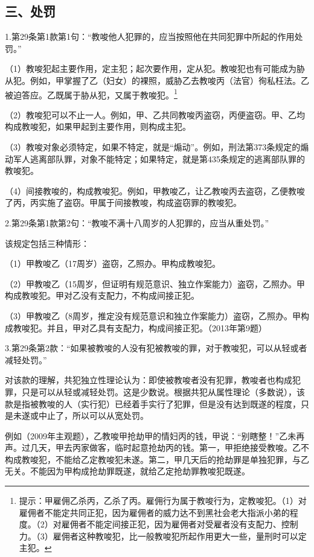 \subsection*{三、处罚}

1.第29条第1款第1句：“教唆他人犯罪的，应当按照他在共同犯罪中所起的作用处罚。”

（1）教唆犯起主要作用，定主犯；起次要作用，定从犯。教唆犯也有可能成为胁从犯。例如，甲掌握了乙（妇女）的裸照，威胁乙去教唆丙（法官）徇私枉法。乙被迫答应。乙既属于胁从犯，又属于教唆犯。\footnote{提示：甲雇佣乙杀丙，乙杀了丙。雇佣行为属于教唆行为，定教唆犯。（1）对雇佣者不能定共同正犯，因为雇佣者的威力达不到黑社会老大指派小弟的程度。（2）对雇佣者不能定间接正犯，因为雇佣者对受雇者没有支配力、控制力。（3）雇佣者这种教唆犯，比一般教唆犯所起作用更大一些，量刑时可以定主犯。}

（2）教唆犯可以不止一人。例如，甲、乙共同教唆丙盗窃，丙便盗窃。甲、乙均构成教唆犯，如果甲起到主要作用，则构成主犯。

（3）教唆对象必须特定，如果不特定，就是“煽动”。例如，刑法第373条规定的煽动军人逃离部队罪，对象不能特定；如果特定，就是第435条规定的逃离部队罪的教唆犯。

（4）间接教唆的，构成教唆犯。例如，甲教唆乙，让乙教唆丙去盗窃，乙便教唆了丙，丙实施了盗窃。甲属于间接教唆，构成盗窃罪的教唆犯。

2.第29条第1款第2句：“教唆不满十八周岁的人犯罪的，应当从重处罚。”

该规定包括三种情形：

（1）甲教唆乙（17周岁）盗窃，乙照办。甲构成教唆犯。

（2）甲教唆乙（15周岁，但证明有规范意识、独立作案能力）盗窃，乙照办。甲构成教唆犯。甲对乙没有支配力，不构成间接正犯。

（3）甲教唆乙（8周岁，推定没有规范意识和独立作案能力）盗窃，乙照办。甲构成教唆犯。并且，甲对乙具有支配力，构成间接正犯。（2013年第9题）

3.第29条第2款：“如果被教唆的人没有犯被教唆的罪，对于教唆犯，可以从轻或者减轻处罚。”

对该款的理解，共犯独立性理论认为：即使被教唆者没有犯罪，教唆者也构成犯罪，只是可以从轻或减轻处罚。这是少数说。根据共犯从属性理论（多数说），该款是指被教唆的人（实行犯）已经着手实行了犯罪，但是没有达到既遂的程度，只是未遂或中止了，所以可以从宽处罚。

例如（2009年主观题），乙教唆甲抢劫甲的情妇丙的钱，甲说：“别瞎整！”乙未再声。过几天，甲去丙家做客，临时起意抢劫丙的钱。第一，甲拒绝接受教唆。乙不构成教唆犯，不能给乙定教唆犯未遂。第二，甲几天后的抢劫罪是单独犯罪，与乙无关。不能因为甲构成抢劫罪既遂，就给乙定抢劫罪教唆犯既遂。

